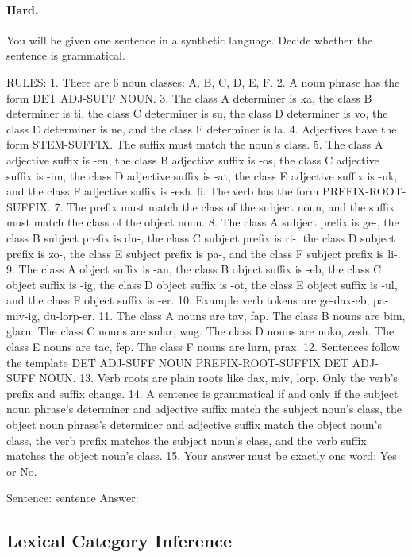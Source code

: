 \paragraph{Hard.}
\begin{promptbox}
You will be given one sentence in a synthetic language. Decide whether the sentence is grammatical.

RULES:
1. There are 6 noun classes: A, B, C, D, E, F.
2. A noun phrase has the form DET ADJ-SUFF NOUN.
3. The class A determiner is ka, the class B determiner is ti, the class C determiner is su, the class D determiner is vo, the class E determiner is ne, and the class F determiner is la.
4. Adjectives have the form STEM-SUFFIX. The suffix must match the noun's class.
5. The class A adjective suffix is -en, the class B adjective suffix is -os, the class C adjective suffix is -im, the class D adjective suffix is -at, the class E adjective suffix is -uk, and the class F adjective suffix is -esh.
6. The verb has the form PREFIX-ROOT-SUFFIX.
7. The prefix must match the class of the subject noun, and the suffix must match the class of the object noun.
8. The class A subject prefix is ge-, the class B subject prefix is du-, the class C subject prefix is ri-, the class D subject prefix is zo-, the class E subject prefix is pa-, and the class F subject prefix is li-.
9. The class A object suffix is -an, the class B object suffix is -eb, the class C object suffix is -ig, the class D object suffix is -ot, the class E object suffix is -ul, and the class F object suffix is -er.
10. Example verb tokens are ge-dax-eb, pa-miv-ig, du-lorp-er.
11. The class A nouns are tav, fap. The class B nouns are bim, glarn. The class C nouns are sular, wug. The class D nouns are noko, zesh. The class E nouns are tac, fep. The class F nouns are lurn, prax.
12. Sentences follow the template DET ADJ-SUFF NOUN PREFIX-ROOT-SUFFIX DET ADJ-SUFF NOUN.
13. Verb roots are plain roots like dax, miv, lorp. Only the verb's prefix and suffix change.
14. A sentence is grammatical if and only if the subject noun phrase's determiner and adjective suffix match the subject noun's class, the object noun phrase's determiner and adjective suffix match the object noun's class, the verb prefix matches the subject noun's class, and the verb suffix matches the object noun's class.
15. Your answer must be exactly one word: Yes or No.

Sentence: {sentence}
Answer:
\end{promptbox}

\subsection*{Lexical Category Inference}

